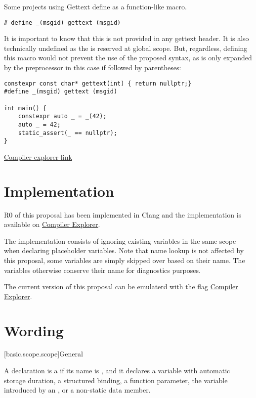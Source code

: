 \documentclass{wg21}
\begin{document}
{Some projects using Gettext define \tcode{_} as a function-like macro.

\begin{lstlisting}[style=color]
# define _(msgid) gettext (msgid)
\end{lstlisting}

It is important to know that this is not provided in any gettext header.
It is also technically undefined as the \tcode{_} is reserved at global scope.
But, regardless, defining this macro would not prevent the use of the proposed syntax, as \tcode{_} is only
expanded by the preprocessor in this case if followed by parentheses:

\begin{lstlisting}[style=color]
constexpr const char* gettext(int) { return nullptr;}
#define _(msgid) gettext (msgid)

int main() {
    constexpr auto _ = _(42);
    auto _ = 42;
    static_assert(_ == nullptr);
}

\end{lstlisting}

\href{https://godbolt.org/z/FRFg9-}{Compiler explorer link}

\section{Implementation}

R0 of this proposal has been implemented in Clang and the implementation is available on \href{https://godbolt.org/z/5lmnfN}{Compiler Explorer}.

The implementation consists of ignoring existing \tcode{_} variables in the same scope when declaring placeholder variables.
Note that name lookup is not affected by this proposal, some variables are simply skipped over based on their name.
The variables otherwise conserve their name for diagnostics purposes.

The current version of this proposal can be emulaterd with the  flag \href{https://godbolt.org/z/_C6X7L}{Compiler Explorer}.


\section{Wording}

[basic.scope.scope]{General}

\begin{addedblock}
A declaration is a  if its name is \tcode{_},
and it declares a variable with automatic storage duration, a structured binding, a function parameter, the variable introduced by an , or a non-static data member.



\end{addedblock}}
\end{document}
